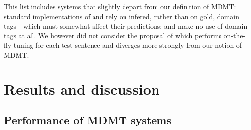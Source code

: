 This list includes systems that slightly depart from our definition of MDMT: standard implementations of  and  rely on infered, rather than on gold, domain tags - which must somewhat affect their predictions;  and  make no use of domain tags at all. We however did not consider the proposal of \cite{Farajian17multidomain} which performs on-the-fly tuning for each test sentence and diverges more strongly from our notion of MDMT.

\section{Results and discussion \label{sec:results}}

\subsection{Performance of MDMT systems \label{ssec:rawperformance}}

